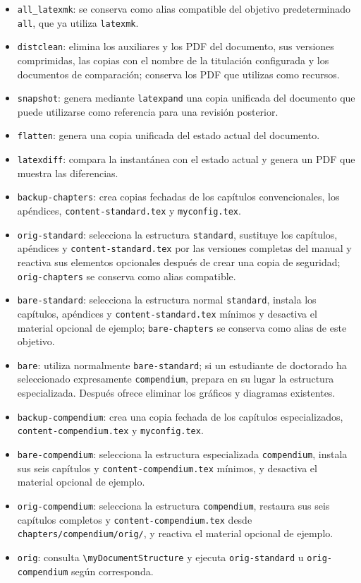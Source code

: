 \begin{itemize}
  \item \texttt{all\_latexmk}: se conserva como alias compatible del objetivo predeterminado \texttt{all}, que ya utiliza \texttt{latexmk}.
  \item \texttt{distclean}: elimina los auxiliares y los PDF del documento, sus versiones comprimidas, las copias con el nombre de la titulación configurada y los documentos de comparación; conserva los PDF que utilizas como recursos.
  \item \texttt{snapshot}: genera mediante \texttt{latexpand} una copia unificada del documento que puede utilizarse como referencia para una revisión posterior.
  \item \texttt{flatten}: genera una copia unificada del estado actual del documento.
  \item \texttt{latexdiff}: compara la instantánea con el estado actual y genera un PDF que muestra las diferencias.
  \item \texttt{backup-chapters}: crea copias fechadas de los capítulos convencionales, los apéndices, \texttt{content-standard.tex} y \texttt{myconfig.tex}.
  \item \texttt{orig-standard}: selecciona la estructura \texttt{standard}, sustituye los capítulos, apéndices y \texttt{content-standard.tex} por las versiones completas del manual y reactiva sus elementos opcionales después de crear una copia de seguridad; \texttt{orig-chapters} se conserva como alias compatible.
  \item \texttt{bare-standard}: selecciona la estructura normal \texttt{standard}, instala los capítulos, apéndices y \texttt{content-standard.tex} mínimos y desactiva el material opcional de ejemplo; \texttt{bare-chapters} se conserva como alias de este objetivo.
  \item \texttt{bare}: utiliza normalmente \texttt{bare-standard}; si un estudiante de doctorado ha seleccionado expresamente \texttt{compendium}, prepara en su lugar la estructura especializada. Después ofrece eliminar los gráficos y diagramas existentes.
  \item \texttt{backup-compendium}: crea una copia fechada de los capítulos especializados, \texttt{content-compendium.tex} y \texttt{myconfig.tex}.
  \item \texttt{bare-compendium}: selecciona la estructura especializada \texttt{compendium}, instala sus seis capítulos y \texttt{content-compendium.tex} mínimos, y desactiva el material opcional de ejemplo.
  \item \texttt{orig-compendium}: selecciona la estructura \texttt{compendium}, restaura sus seis capítulos completos y \texttt{content-compendium.tex} desde \texttt{chapters/compendium/orig/}, y reactiva el material opcional de ejemplo.
  \item \texttt{orig}: consulta \texttt{\textbackslash{}myDocumentStructure} y ejecuta \texttt{orig-standard} u \texttt{orig-compendium} según corresponda.
\end{itemize}

